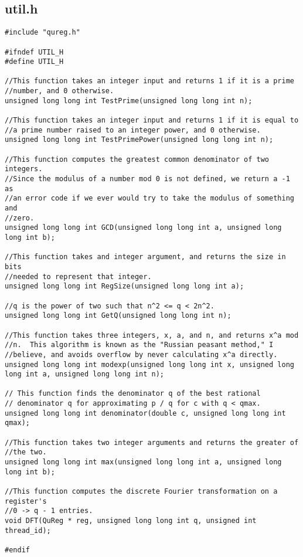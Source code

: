 \documentclass[]{article}
\begin{document}
\subsection{util.h}
\begin{verbatim}
#include "qureg.h"

#ifndef UTIL_H
#define UTIL_H

//This function takes an integer input and returns 1 if it is a prime
//number, and 0 otherwise.
unsigned long long int TestPrime(unsigned long long int n);

//This function takes an integer input and returns 1 if it is equal to
//a prime number raised to an integer power, and 0 otherwise.
unsigned long long int TestPrimePower(unsigned long long int n);

//This function computes the greatest common denominator of two integers.
//Since the modulus of a number mod 0 is not defined, we return a -1 as
//an error code if we ever would try to take the modulus of something and
//zero.
unsigned long long int GCD(unsigned long long int a, unsigned long long int b);

//This function takes and integer argument, and returns the size in bits
//needed to represent that integer.
unsigned long long int RegSize(unsigned long long int a);

//q is the power of two such that n^2 <= q < 2n^2.
unsigned long long int GetQ(unsigned long long int n);

//This function takes three integers, x, a, and n, and returns x^a mod
//n.  This algorithm is known as the "Russian peasant method," I
//believe, and avoids overflow by never calculating x^a directly.
unsigned long long int modexp(unsigned long long int x, unsigned long long int a, unsigned long long int n);

// This function finds the denominator q of the best rational
// denominator q for approximating p / q for c with q < qmax.
unsigned long long int denominator(double c, unsigned long long int qmax);

//This function takes two integer arguments and returns the greater of
//the two.
unsigned long long int max(unsigned long long int a, unsigned long long int b);

//This function computes the discrete Fourier transformation on a register's
//0 -> q - 1 entries. 
void DFT(QuReg * reg, unsigned long long int q, unsigned int thread_id);

#endif
\end{verbatim}
\end{document}
